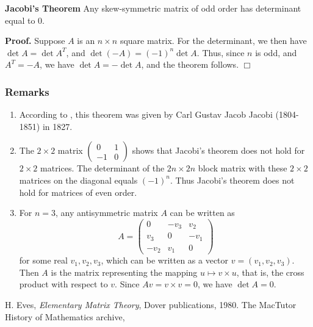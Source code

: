 \documentclass[12pt]{article}
\begin{document}
{\bf Jacobi's Theorem} Any skew-symmetric matrix of odd order has determinant equal to $0$. 

{\bf Proof.} Suppose $A$ is an $n\times n$ square matrix. 
For the determinant, we then have $\det A = \det A^T$, and
$\det (-A) = (-1)^n \det A$. Thus, since $n$ is odd, and $A^T=-A$, we have
 $\det A = -\det A$, and the theorem follows.  $\Box$

\subsubsection{Remarks}
\begin{enumerate}
\item  According to \cite{eves}, this theorem was given by 
Carl Gustav Jacob Jacobi (1804-1851) \cite{jacobi} in 1827.

\item The $2\times 2$ matrix $\left( \begin{array}{cc}
 0 & 1 \\
 -1 & 0
 \end{array} \right)$ shows that Jacobi's theorem does not hold for $2\times 2$ 
matrices. The determinant of the  $2n\times 2n$ block matrix with 
these $2\times 2$ matrices on the diagonal equals $(-1)^n$. Thus Jacobi's theorem
does not hold for matrices of even order.

\item For $n=3$, any antisymmetric matrix $A$ can be written 
as
$$ A =
\begin{pmatrix}
0 & -v_3 & v_2 \\
v_3 & 0 & -v_1 \\
-v_2 & v_1 & 0
\end{pmatrix}
$$
for some real $v_1,v_2,v_3$, which can be written as a
vector $v=(v_1,v_2,v_3)$. Then $A$ is the matrix representing the
mapping $u\mapsto v\times u$, that is, the cross product with 
respect to $v$. Since $Av=v\times v=0$, we have $\det A=0$. 
\end{enumerate}

\begin{thebibliography}{9}
 H. Eves,
        \emph{Elementary Matrix Theory},
        Dover publications, 1980.
 The MacTutor History of Mathematics archive,
\end{thebibliography}
\end{document}
